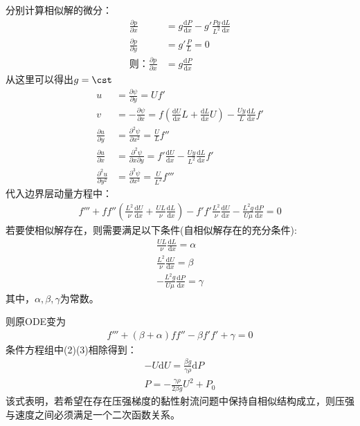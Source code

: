 分别计算相似解的微分：
\begin{align}
    \frac{\partial p}{\partial x}&=g\frac{\mathrm{d}P}{\mathrm{d}x}-g'\frac{Py}{L^{2}}\frac{\mathrm{d}L}{\mathrm{d}x}\\
    \frac{\partial p}{\partial y}&=g'\frac{P}{L}=0\\
    \text{则}：\frac{\partial p}{\partial x}&=g\frac{\mathrm{d}P}{\mathrm{d}x}
\end{align}
从这里可以得出$g=\cst$
\begin{align}
    u&=\frac{\partial \psi}{\partial y}=Uf'\\
    v&=-\frac{\partial \psi}{\partial x}=f\left(\frac{\mathrm{d}U}{\mathrm{d}x}L+\frac{\mathrm{d}L}{\mathrm{d}x}U\right)-\frac{Uy}{L}\frac{\mathrm{d}L}{\mathrm{d}x}f'\\
    \frac{\partial u}{\partial y}&=\frac{\partial^{2} \psi}{\partial x^{2}}=\frac{U}{L}f''\\
    \frac{\partial u}{\partial x}&=\frac{\partial^{2} \psi}{\partial x\partial y}=f'\frac{\mathrm{d}U}{\mathrm{d}x}-\frac{Uy}{L^{2}}\frac{\mathrm{d}L}{\mathrm{d}x}f'\\
    \frac{\partial^{2} u}{\partial y^{2}}&=\frac{\partial^{3} \psi}{\partial x^{3}}=\frac{U}{L^{2}}f'''
\end{align}
代入边界层动量方程中：
\begin{align}
    f'''+ff''\left(\frac{L^{2}}{\nu}\frac{\mathrm{d}U}{\mathrm{d}x}+\frac{UL}{\nu}\frac{\mathrm{d}L}{\mathrm{d}x}\right)-f'f'\frac{L^{2}}{\nu}\frac{\mathrm{d}U}{\mathrm{d}x}-\frac{L^{2}g}{U\mu}\frac{\mathrm{d} P}{\mathrm{d} x}=0
\end{align}
若要使相似解存在，则需要满足以下条件(自相似解存在的充分条件):
\begin{align}
    \frac{UL}{\nu}\frac{\mathrm{d}L}{\mathrm{d}x}=\alpha\\
    \frac{L^{2}}{\nu}\frac{\mathrm{d}U}{\mathrm{d}x}=\beta\\
    -\frac{L^{2}g}{U\mu}\frac{\mathrm{d} P}{\mathrm{d} x}=\gamma
\end{align}
其中，$\alpha,\beta,\gamma$为常数。

则原ODE变为
\begin{align}
    \label{eq-ODE}
    f'''+(\beta+\alpha)ff''-\beta f'f'+\gamma=0
\end{align}
条件方程组中(2)(3)相除得到：
\begin{align}
    -U\mathrm{d}U=\frac{\beta g}{\gamma \rho}\mathrm{d}P\\
    P=-\frac{\gamma \rho}{2\beta g}U^{2}+P_{0}
\end{align}
该式表明，若希望在存在压强梯度的黏性射流问题中保持自相似结构成立，则压强与速度之间必须满足一个二次函数关系。

